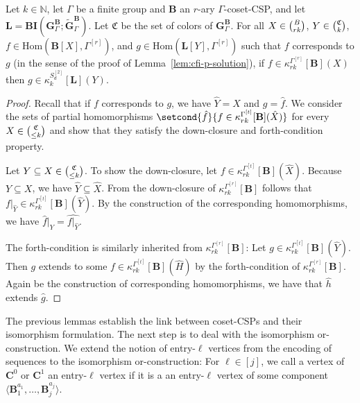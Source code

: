 \documentclass[a4paper,english, thm-restate]{lipics-v2021}
\newcommand{\nat}{\mathbb{N}}
\newcommand{\CFIsym}{\mathbf{G}}
\newcommand{\CFIA}[2]{\CFIsym_{#1}^{#2}}
\newcommand{\CFIB}[2]{\widetilde{\CFIsym}_{#1}^{#2}}
\newcommand{\StructB}{\mathbf{B}}
\newcommand{\StructC}{\mathbf{C}}
\newcommand{\StructL}{\mathbf{L}}
\newcommand{\kcol}[3]{\kappa_{#1}^{#2}[#3]}
\newcommand{\restrict}[2]{#1|_{#2}}
\newcommand{\Hom}[2]{\mathrm{Hom}(#1,#2)}
\newcommand{\bcisosys}[2]{\mathbf{BI}(#1;#2)}
\newcommand{\colors}{\mathfrak{C}}
\newcommand{\CosetGrpTmplt}[2]{#1^{[#2]}}
\newcommand{\Sym}[1]{S_{#1}}
\newcommand{\SymStruct}[2]{\CosetGrpTmplt{\Sym{#1}}{#2}}
\begin{document}
	\begin{lemma}
		\label{lem:cfi-k-consistency}
		Let $k \in \nat$, let $\Gamma$ be a finite group and $\StructB$ an $r$-ary $\Gamma$-coset-CSP,
		and let $\StructL = \bcisosys{\CFIA{\Gamma}{\StructB}}{\CFIB{\Gamma}{\StructB}}$.
		Let $\colors$ be the set of colors of $\CFIA{\Gamma}{\StructB}$.
		For all $X \in \tbinom{B}{rk}$, $Y \in \tbinom{\colors}{k}$,
		$f \in \Hom{\StructB[X]}{\CosetGrpTmplt{\Gamma}{r}}$,
		and $g \in \Hom{\StructL[Y]}{\CosetGrpTmplt{\Gamma}{r}}$
		such that $f$ corresponds to $g$
		(in the sense of the proof of Lemma~\ref{lem:cfi-p-solution}),
		if $f \in \kcol{rk}{\CosetGrpTmplt{\Gamma}{r}}{\StructB}(X)$
		then $g \in \kcol{k}{\SymStruct{d}{2}}{\StructL}(Y)$.	
\end{lemma}
	\begin{proof}
		Recall that if $f$ corresponds to $g$,
		we have $\hat{Y} = X$ and $g = \hat{f}$.
		We consider the sets of partial homomorphisms
		$\setcond{\hat{f}}{f \in \kcol{rk}{\CosetGrpTmplt{\Gamma}{t}}{\StructB}(\hat{X})}$
		for every $X \in \tbinom{\colors}{\leq k}$
		and show that they satisfy the down-closure and forth-condition property.
		
		Let $Y \subseteq X \in \tbinom{\colors}{\leq k}$.
		To show the down-closure,
		let $f \in \kcol{rk}{\CosetGrpTmplt{\Gamma}{t}}{\StructB}(\hat{X})$.
		Because $Y \subseteq X$, we have $\hat{Y} \subseteq \hat{X}$.
		From the down-closure of $\kcol{rk}{\CosetGrpTmplt{\Gamma}{r}}{\StructB}$
		follows that $\restrict{f}{\hat{Y}} \in \kcol{rk}{\CosetGrpTmplt{\Gamma}{t}}{\StructB}(\hat{Y})$.
		By the construction of the corresponding homomorphisms,
		we have $\restrict{\hat{f}}{Y} = \widehat{\restrict{f}{\hat{Y}}}$.
		
		The forth-condition is similarly inherited from $\kcol{rk}{\CosetGrpTmplt{\Gamma}{r}}{\StructB}$:
		Let $g \in \kcol{rk}{\CosetGrpTmplt{\Gamma}{t}}{\StructB}(\hat{Y})$.
		Then $g$ extends to some $f \in \kcol{rk}{\CosetGrpTmplt{\Gamma}{t}}{\StructB}(\hat{H})$
		by the forth-condition of $ \kcol{rk}{\CosetGrpTmplt{\Gamma}{r}}{\StructB}$.
		Again be the construction of corresponding homomorphisms,
		we have that $\hat{h}$ extends $\hat{g}$.
	\end{proof}
	
	The previous lemmas establish the link between coset-CSPs and their isomorphism formulation. The next step is to deal with the isomorphism or-construction.
	We extend the notion of entry-$\ell$ vertices from the encoding of sequences
	to the isomorphism or-construction:
	For $\ell \in [j]$, we call a vertex of $\StructC^0$ or $\StructC^1$
	an entry-$\ell$ vertex
	if it is a an entry-$\ell$ vertex of some component $\langle \StructB_1^{a_1}, \dots, \StructB_j^{a_j} \rangle$.
	
\end{document}

